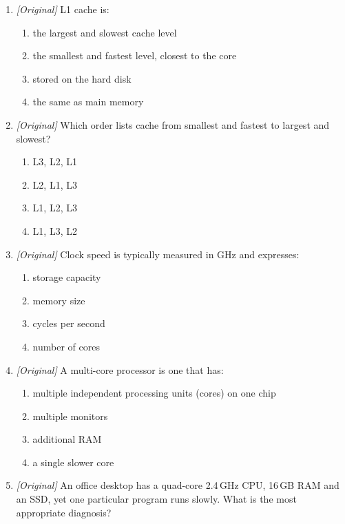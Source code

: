 \begin{enumerate}[label=\textbf{Q\arabic*.}, leftmargin=*]
\begin{enumerate}[label=\Alph*.]
    \item I and II only
    \item II and III only
    \item I, II, and III
  \end{enumerate}
\item \textit{[Original]} L1 cache is:
  \begin{enumerate}[label=\Alph*.]
    \item the largest and slowest cache level
    \item the smallest and fastest level, closest to the core
    \item stored on the hard disk
    \item the same as main memory
  \end{enumerate}
\item \textit{[Original]} Which order lists cache from smallest and fastest to
  largest and slowest?
  \begin{enumerate}[label=\Alph*.]
    \item L3, L2, L1
    \item L2, L1, L3
    \item L1, L2, L3
    \item L1, L3, L2
  \end{enumerate}
\item \textit{[Original]} Clock speed is typically measured in GHz and
  expresses:
  \begin{enumerate}[label=\Alph*.]
    \item storage capacity
    \item memory size
    \item cycles per second
    \item number of cores
  \end{enumerate}
\item \textit{[Original]} A multi-core processor is one that has:
  \begin{enumerate}[label=\Alph*.]
    \item multiple independent processing units (cores) on one chip
    \item multiple monitors
    \item additional RAM
    \item a single slower core
  \end{enumerate}
\item \textit{[Original]} An office desktop has a quad-core 2.4\,GHz CPU,
  16\,GB RAM and an SSD, yet one particular program runs slowly. What is the
  most appropriate diagnosis?

\end{enumerate}
